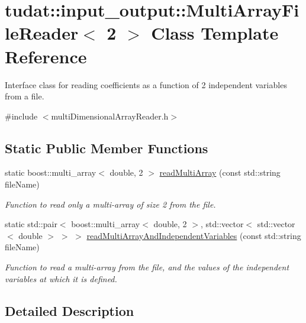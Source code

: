 \hypertarget{classtudat_1_1input__output_1_1MultiArrayFileReader_3_012_01_4}{}\section{tudat\+:\+:input\+\_\+output\+:\+:Multi\+Array\+File\+Reader$<$ 2 $>$ Class Template Reference}
\label{classtudat_1_1input__output_1_1MultiArrayFileReader_3_012_01_4}


Interface class for reading coefficients as a function of 2 independent variables from a file.  




{\ttfamily \#include $<$multi\+Dimensional\+Array\+Reader.\+h$>$}

\subsection*{Static Public Member Functions}
\begin{DoxyCompactItemize}
\item 
static boost\+::multi\+\_\+array$<$ double, 2 $>$ \hyperlink{classtudat_1_1input__output_1_1MultiArrayFileReader_3_012_01_4_a9aa87c74597aabe34c05161fe4641bb3}{read\+Multi\+Array} (const std\+::string file\+Name)
\begin{DoxyCompactList}\small\item\em Function to read only a multi-\/array of size 2 from the file. \end{DoxyCompactList}\item 
static std\+::pair$<$ boost\+::multi\+\_\+array$<$ double, 2 $>$, std\+::vector$<$ std\+::vector$<$ double $>$ $>$ $>$ \hyperlink{classtudat_1_1input__output_1_1MultiArrayFileReader_3_012_01_4_ade30d3ab35b2a84d6e5cd440ecf1b115}{read\+Multi\+Array\+And\+Independent\+Variables} (const std\+::string file\+Name)
\begin{DoxyCompactList}\small\item\em Function to read a multi-\/array from the file, and the values of the independent variables at which it is defined. \end{DoxyCompactList}\end{DoxyCompactItemize}


\subsection{Detailed Description}
